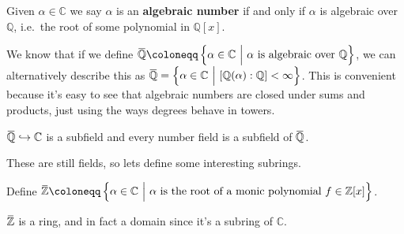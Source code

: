 \begin{definition}

Given \(\alpha\in {\mathbb{C}}\) we say \(\alpha\) is an
\textbf{algebraic number} if and only if \(\alpha\) is algebraic over
\({\mathbb{Q}}\), i.e.~the root of some polynomial in
\({\mathbb{Q}}[x]\).

\end{definition}

\begin{remark}

We know that if we define
\(\mkern 1.5mu\overline{\mkern-1.5mu{\mathbb{Q}}\mkern-1.5mu}\mkern 1.5mu\coloneqq\left\{{\alpha\in {\mathbb{C}}{~\mathrel{\Big|}~}\alpha \text{ is algebraic over } {\mathbb{Q}}}\right\}\),
we can alternatively describe this as
\(\mkern 1.5mu\overline{\mkern-1.5mu{\mathbb{Q}}\mkern-1.5mu}\mkern 1.5mu= \left\{{ \alpha\in {\mathbb{C}}{~\mathrel{\Big|}~}[{\mathbb{Q}}(\alpha) : {\mathbb{Q}}] < \infty }\right\}\).
This is convenient because it's easy to see that algebraic numbers are
closed under sums and products, just using the ways degrees behave in
towers.

\end{remark}

\begin{corollary}

\(\mkern 1.5mu\overline{\mkern-1.5mu{\mathbb{Q}}\mkern-1.5mu}\mkern 1.5mu\hookrightarrow{\mathbb{C}}\)
is a subfield and every number field is a subfield of
\(\mkern 1.5mu\overline{\mkern-1.5mu{\mathbb{Q}}\mkern-1.5mu}\mkern 1.5mu\).

\end{corollary}

\begin{remark}

These are still fields, so lets define some interesting subrings.

\end{remark}

\begin{definition}[$\bar \ZZ$ ]

Define
\(\mkern 1.5mu\overline{\mkern-1.5mu{\mathbb{Z}}\mkern-1.5mu}\mkern 1.5mu\coloneqq\left\{{ \alpha\in {\mathbb{C}}{~\mathrel{\Big|}~}\alpha\text{ is the root of a monic polynomial }f\in {\mathbb{Z}}[x]}\right\}\).

\end{definition}

\begin{theorem}

\(\mkern 1.5mu\overline{\mkern-1.5mu{\mathbb{Z}}\mkern-1.5mu}\mkern 1.5mu\)
is a ring, and in fact a domain since it's a subring of
\({\mathbb{C}}\).

\end{theorem}

